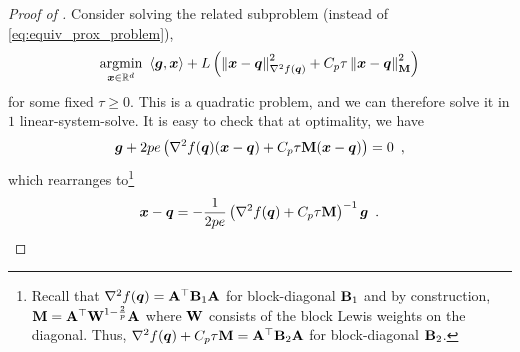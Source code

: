 \begin{proof}[Proof of ]
Consider solving the related subproblem (instead of \eqref{eq:equiv_prox_problem}),
\begin{align*}
    \underset{\bm{x}\in\mathbb{R}^d}{\mathrm{argmin}}\  \left\langle \bm{g},\bm{x} \right\rangle+L\left(\left\lVert \bm{x}-\bm{q} \right\rVert_{\nabla^2 f(\bm{q})}^2 + C_p\tau\left\lVert \bm{x}-\bm{q} \right\rVert_{\mathbf{M}}^2\right)
\end{align*}
for some fixed $\tau \ge 0$. This is a quadratic problem, and we can therefore solve it in $1$ linear-system-solve. It is easy to check that at optimality, we have
\begin{align*}
    \bm{g} + 2pe\left(\nabla^2 f(\bm{q})(\bm{x}-\bm{q}) + C_p\tau\mathbf{M}(\bm{x}-\bm{q})\right) = 0\enspace,
\end{align*}
which rearranges to\footnote{Recall that $\nabla^2 f(\bm{q})=\mathbf{A}^{\top}\mathbf{B}_1\mathbf{A}$ for block-diagonal $\mathbf{B}_1$ and by construction, $\mathbf{M} = \mathbf{A}^{\top}\mathbf{W}^{1-\frac{2}{p}}\mathbf{A}$ where $\mathbf{W}$ consists of the block Lewis weights on the diagonal. Thus, $\nabla^2 f(\bm{q}) + C_p\tau\mathbf{M}=\mathbf{A}^{\top}\mathbf{B}_2\mathbf{A}$ for block-diagonal $\mathbf{B}_2$.}
\begin{align*}
    \bm{x}-\bm{q} = -\frac{1}{2pe}\left(\nabla^2 f(\bm{q})+C_p\tau\mathbf{M}\right)^{-1}\bm{g}\enspace.
\end{align*}


\end{proof}

